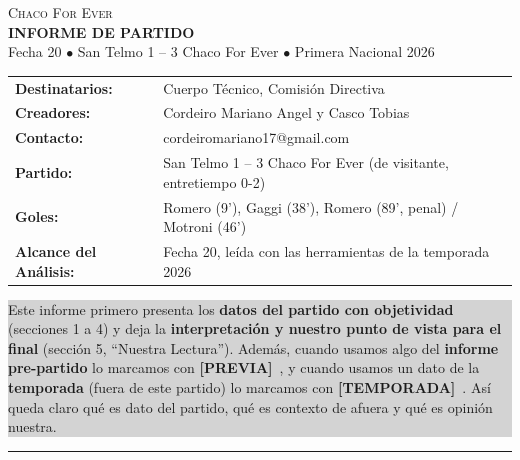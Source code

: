 \documentclass[11pt, a4paper]{article}
\newcommand{\previa}{{\footnotesize\textbf{\color{warnamber}[PREVIA]}}\ }
\newcommand{\temp}{{\footnotesize\textbf{\color{darkgray}[TEMPORADA]}}\ }
\begin{document}
\begin{center}
  \colorbox{primary}{%
    \parbox{\dimexpr\textwidth-2\fboxsep\relax}{%
      \vspace{4mm}
      \centering
      \color{white}
      \textsc{\Large Chaco For Ever} \\
      \smallskip
      \textbf{\Large INFORME DE PARTIDO} \\
      \vspace{1mm}
      \small Fecha 20 $\bullet$ San Telmo 1 -- 3 Chaco For Ever $\bullet$ Primera Nacional 2026
      \vspace{4mm}
    }%
  }
\end{center}

\vspace{4mm}

\begin{tabular}{ll}
  \textbf{Destinatarios:} & Cuerpo Técnico, Comisión Directiva \\
  \textbf{Creadores:} & Cordeiro Mariano Angel y Casco Tobias \\
  \textbf{Contacto:} & cordeiromariano17@gmail.com \\
  \textbf{Partido:} & San Telmo 1 -- 3 Chaco For Ever (de visitante, entretiempo 0-2) \\
  \textbf{Goles:} & Romero (9'), Gaggi (38'), Romero (89', penal) \quad / \quad Motroni (46') \\
  \textbf{Alcance del Análisis:} & Fecha 20, leída con las herramientas de la temporada 2026 \\
\end{tabular}

\vspace{3mm}
\noindent\colorbox{lightgray}{%
  \parbox{\dimexpr\textwidth-2\fboxsep\relax}{%
    \smallskip
    \small Este informe primero presenta los \textbf{datos del partido con objetividad} (secciones 1 a 4) y
    deja la \textbf{interpretación y nuestro punto de vista para el final} (sección 5, ``Nuestra Lectura'').
    Además, cuando usamos algo del \textbf{\color{warnamber}informe pre-partido} lo marcamos con \previa, y
    cuando usamos un dato de la \textbf{\color{darkgray}temporada} (fuera de este partido) lo marcamos con
    \temp. Así queda claro qué es dato del partido, qué es contexto de afuera y qué es opinión nuestra.\smallskip
  }%
}
\vspace{2mm}
\hrule
\vspace{4mm}

\end{document}
